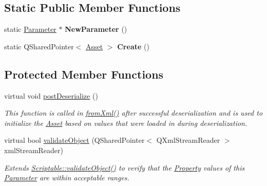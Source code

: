 \subsection*{Static Public Member Functions}
\begin{DoxyCompactItemize}
\item 
\hypertarget{class_picto_1_1_string_parameter_a932e74490c507c5ac0614057ec98504e}{static \hyperlink{class_picto_1_1_parameter}{Parameter} $\ast$ {\bfseries New\-Parameter} ()}\label{class_picto_1_1_string_parameter_a932e74490c507c5ac0614057ec98504e}

\item 
\hypertarget{class_picto_1_1_string_parameter_a7085faf96f44d2653464994f448353da}{static Q\-Shared\-Pointer$<$ \hyperlink{class_picto_1_1_asset}{Asset} $>$ {\bfseries Create} ()}\label{class_picto_1_1_string_parameter_a7085faf96f44d2653464994f448353da}

\end{DoxyCompactItemize}
\subsection*{Protected Member Functions}
\begin{DoxyCompactItemize}
\item 
virtual void \hyperlink{class_picto_1_1_string_parameter_ac43c3d2830299761848f2faa982e088d}{post\-Deserialize} ()
\begin{DoxyCompactList}\small\item\em This function is called in \hyperlink{class_picto_1_1_asset_a8bed4da09ecb1c07ce0dab313a9aba67}{from\-Xml()} after successful deserialization and is used to initialize the \hyperlink{class_picto_1_1_asset}{Asset} based on values that were loaded in during deserialization. \end{DoxyCompactList}\item 
virtual bool \hyperlink{class_picto_1_1_string_parameter_ae3f4be0d90aea389c997542255473282}{validate\-Object} (Q\-Shared\-Pointer$<$ Q\-Xml\-Stream\-Reader $>$ xml\-Stream\-Reader)
\begin{DoxyCompactList}\small\item\em Extends \hyperlink{class_picto_1_1_scriptable_ab6e2944c43a3b5d418bf7b251594386d}{Scriptable\-::validate\-Object()} to verify that the \hyperlink{class_picto_1_1_property}{Property} values of this \hyperlink{class_picto_1_1_parameter}{Parameter} are within acceptable ranges. \end{DoxyCompactList}\end{DoxyCompactItemize}
